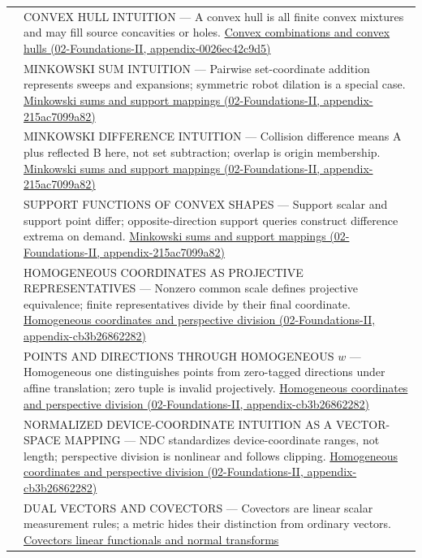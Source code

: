 {\begin{longtable}[]{@{}
  >{\raggedright\arraybackslash}p{}
  >{\raggedright\arraybackslash}p{}@{}}
574 & CONVEX HULL INTUITION --- A convex hull is all finite convex mixtures and may fill source concavities or holes. \href{../02-Foundations-II/main.pdf\#nameddest=appendix-0026ec42c9d5}{Convex combinations and convex hulls (02-Foundations-II, appendix-0026ec42c9d5)} \\
575 & MINKOWSKI SUM INTUITION --- Pairwise set-coordinate addition represents sweeps and expansions; symmetric robot dilation is a special case. \href{../02-Foundations-II/main.pdf\#nameddest=appendix-215ac7099a82}{Minkowski sums and support mappings (02-Foundations-II, appendix-215ac7099a82)} \\
576 & MINKOWSKI DIFFERENCE INTUITION --- Collision difference means A plus reflected B here, not set subtraction; overlap is origin membership. \href{../02-Foundations-II/main.pdf\#nameddest=appendix-215ac7099a82}{Minkowski sums and support mappings (02-Foundations-II, appendix-215ac7099a82)} \\
577 & SUPPORT FUNCTIONS OF CONVEX SHAPES --- Support scalar and support point differ; opposite-direction support queries construct difference extrema on demand. \href{../02-Foundations-II/main.pdf\#nameddest=appendix-215ac7099a82}{Minkowski sums and support mappings (02-Foundations-II, appendix-215ac7099a82)} \\
578 & HOMOGENEOUS COORDINATES AS PROJECTIVE REPRESENTATIVES --- Nonzero common scale defines projective equivalence; finite representatives divide by their final coordinate. \href{../02-Foundations-II/main.pdf\#nameddest=appendix-cb3b26862282}{Homogeneous coordinates and perspective division (02-Foundations-II, appendix-cb3b26862282)} \\
579 & POINTS AND DIRECTIONS THROUGH HOMOGENEOUS \(w\) --- Homogeneous one distinguishes points from zero-tagged directions under affine translation; zero tuple is invalid projectively. \href{../02-Foundations-II/main.pdf\#nameddest=appendix-cb3b26862282}{Homogeneous coordinates and perspective division (02-Foundations-II, appendix-cb3b26862282)} \\
580 & NORMALIZED DEVICE-COORDINATE INTUITION AS A VECTOR-SPACE MAPPING --- NDC standardizes device-coordinate ranges, not length; perspective division is nonlinear and follows clipping. \href{../02-Foundations-II/main.pdf\#nameddest=appendix-cb3b26862282}{Homogeneous coordinates and perspective division (02-Foundations-II, appendix-cb3b26862282)} \\
581 & DUAL VECTORS AND COVECTORS --- Covectors are linear scalar measurement rules; a metric hides their distinction from ordinary vectors. \hyperref[appendix-46da295c6787]{Covectors linear functionals and normal transforms} \\

\end{longtable}}
